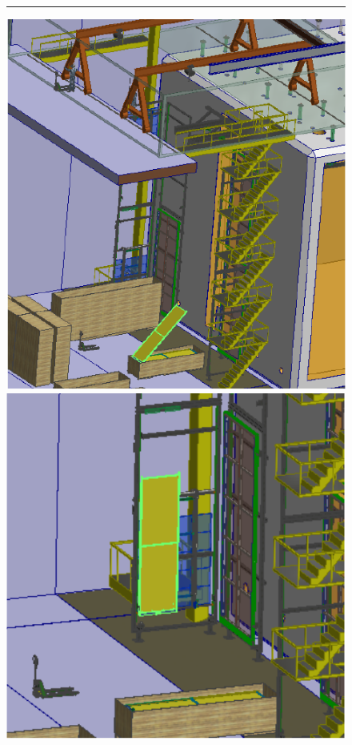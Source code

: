 \begin{figure}
\begin{center}
\begin{minipage}[c]{0.32\textwidth}
\end{minipage}
%
\vspace{5mm}
\hrule
\vspace{5mm}
%
\begin{minipage}[c]{0.32\textwidth}
\includegraphics[width=\textwidth]{far-detector-single-phase/figures/CPA-1.pdf}
\end{minipage}
\begin{minipage}[c]{0.32\textwidth}
\includegraphics[width=\textwidth]{far-detector-single-phase/figures/CPA-2.pdf}

\end{minipage}
\end{center}
\end{figure}
